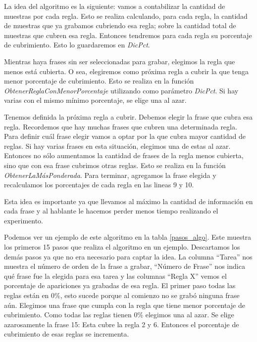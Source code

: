 
La idea del algoritmo es la siguiente: vamos a contabilizar la cantidad de muestras por cada regla. Esto se realiza calculando, para cada regla, la cantidad de muestras que ya grabamos cubriendo esa regla; sobre la cantidad total de muestras que cubren esa regla. Entonces tendremos para cada regla su porcentaje de cubrimiento. Esto lo guardaremos en \textit{DicPct}.

Mientras haya frases sin ser seleccionadas para grabar, elegimos la regla que menos está cubierta. O sea, elegiremos como próxima regla a cubrir la que tenga menor porcentaje de cubrimiento. Esto se realiza en la función \textit{ObtenerReglaConMenorPorcentaje} utilizando como parámetro \textit{DicPct}. Si hay varias con el mismo mínimo porcentaje, se elige una al azar.

Tenemos definida la próxima regla a cubrir. Debemos elegir la frase que cubra esa regla. Recordemos que hay muchas frases que cubren una determinada regla. Para definir cuál frase elegir vamos a optar por la que cubra mayor cantidad de reglas. Si hay varias frases en esta situación, elegimos una de estas al azar. Entonces no sólo aumentamos la cantidad de frases de la regla menos cubierta, sino que con esa frase cubrimos otras reglas. Esto se realiza en la función \textit{ObtenerLaMásPonderada}. Para terminar, agregamos la frase elegida y recalculamos los porcentajes de cada regla en las lineas 9 y 10.

Esta idea es importante ya que llevamos al máximo la cantidad de información en cada frase y al hablante le hacemos perder menos tiempo realizando el experimento.

Podemos ver un ejemplo de este algoritmo en la tabla \ref{pasos_algo}. Este muestra los primeros 15 pasos que realiza el algoritmo en un ejemplo. Descartamos los demás pasos ya que no era necesario para captar la idea. La columna ``Tarea'' nos muestra el número de orden de la frase a grabar, ``Número de Frase'' nos indica qué frase fue la elegida para esa tarea y las columnas ``Regla X'' vemos el porcentaje de apariciones ya grabadas de esa regla. El primer paso todas las reglas están en 0\%, esto sucede porque al comienzo no se grabó ninguna frase aún.  Elegimos una frase que cumpla con la regla que tiene menor porcentaje de cubrimiento. Como todas las reglas tienen 0\% elegimos una al azar. Se elige azarosamente la frase 15: Esta cubre la regla 2 y 6. Entonces el porcentaje de cubrimiento de esas reglas se incrementa. 

